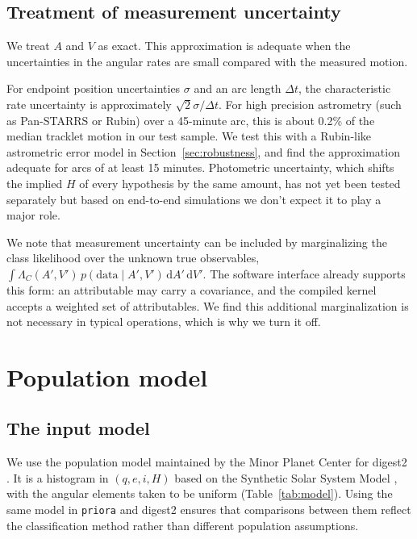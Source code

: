 \documentclass[linenumbers,twocolumn]{aastex701}
\newcommand{\dd}{\mathrm{d}}
\newcommand{\priora}{{\tt priora}\xspace} %
\begin{document}
\subsection{Treatment of measurement uncertainty}
\label{sec:noise}

We treat $A$ and $V$ as exact. This approximation is adequate when the uncertainties in the angular rates
are small compared with the measured motion.

For endpoint position
uncertainties $\sigma$ and an arc length $\Delta t$, the characteristic rate
uncertainty is approximately $\sqrt{2}\sigma/\Delta t$. For high precision
astrometry (such as Pan-STARRS or Rubin) over a 45-minute arc, this is about 0.2\% of the median tracklet motion in our test sample. We test this with a Rubin-like astrometric error model in
Section~\ref{sec:robustness}, and find the approximation adequate for arcs
of at least 15 minutes. Photometric uncertainty, which shifts
the implied $H$ of every hypothesis by the same amount, has not yet been tested
separately but based on end-to-end simulations we don't expect it to play a major role.

We note that measurement uncertainty can be included by marginalizing the class likelihood
over the unknown true observables,
$\int\Lambda_C(A',V')\,p(\mathrm{data}\mid A',V')\,\dd A'\,\dd V'$.
The software interface already supports this form: an attributable may carry
a covariance, and the compiled kernel accepts a weighted set of
attributables. We find this additional marginalization is not necessary in typical operations, which is why we turn it off.


\section{Population model}
\label{sec:population}

\subsection{The input model}
\label{sec:popmodel}

We use the population model maintained by the Minor Planet Center for digest2
\citep{keys2019,veres2023}. It is a histogram in $(q,e,i,H)$ based on the
Synthetic Solar System Model \citep[S3M;][]{grav2011}, with the angular
elements taken to be uniform (Table~\ref{tab:model}). Using the same model in
\priora and digest2 ensures that comparisons between them reflect the
classification method rather than different population assumptions.
\end{document}
